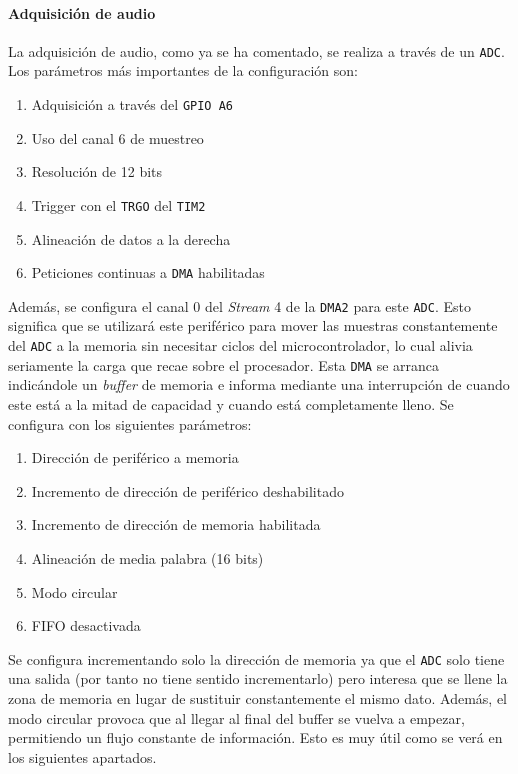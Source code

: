 \paragraph{Adquisición de audio}

La adquisición de audio, como ya se ha comentado, se realiza a través de un \texttt{ADC}. Los parámetros más importantes de la configuración son:
\begin{enumerate}
    \item Adquisición a través del \texttt{GPIO A6}
    \item Uso del canal 6 de muestreo
    \item Resolución de 12 bits
    \item Trigger con el \texttt{TRGO} del \texttt{TIM2}
    \item Alineación de datos a la derecha
    \item Peticiones continuas a \texttt{DMA} habilitadas
\end{enumerate}

Además, se configura el canal 0 del \textit{Stream} 4 de la \texttt{DMA2} para este \texttt{ADC}. Esto significa que se utilizará este periférico para mover las muestras constantemente del \texttt{ADC} a la memoria sin necesitar ciclos del microcontrolador, lo cual alivia seriamente la carga que recae sobre el procesador. Esta \texttt{DMA} se arranca indicándole un \textit{buffer} de memoria e informa mediante una interrupción de cuando este está a la mitad de capacidad y cuando está completamente lleno. Se configura con los siguientes parámetros:
\begin{enumerate}
    \item Dirección de periférico a memoria
    \item Incremento de dirección de periférico deshabilitado
    \item Incremento de dirección de memoria habilitada
    \item Alineación de media palabra (16 bits)
    \item Modo circular
    \item FIFO desactivada
\end{enumerate} 

Se configura incrementando solo la dirección de memoria ya que el \texttt{ADC} solo tiene una salida (por tanto no tiene sentido incrementarlo) pero interesa que se llene la zona de memoria en lugar de sustituir constantemente el mismo dato. Además, el modo circular provoca que al llegar al final del buffer se vuelva a empezar, permitiendo un flujo constante de información. Esto es muy útil como se verá en los siguientes apartados.


